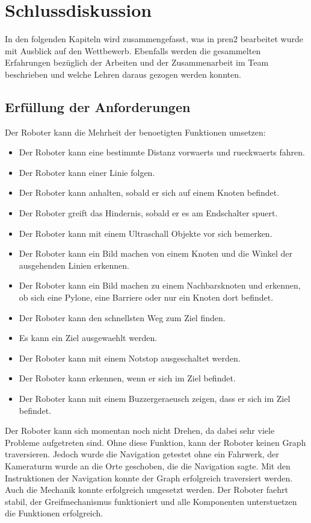 \section{Schlussdiskussion}

In den folgenden Kapiteln wird zusammengefasst, was in \acrshort{pren2} bearbeitet wurde mit Ausblick auf den Wettbewerb.
Ebenfalls werden die gesammelten Erfahrungen bezüglich der Arbeiten und der Zusammenarbeit im Team beschrieben und welche Lehren daraus gezogen werden konnten.

\subsection{Erfüllung der Anforderungen}

Der Roboter kann die Mehrheit der benoetigten Funktionen umsetzen:

\begin{itemize}
    \item Der Roboter kann eine bestimmte Distanz vorwaerts und rueckwaerts fahren.
    \item Der Roboter kann einer Linie folgen.
    \item Der Roboter kann anhalten, sobald er sich auf einem Knoten befindet.
    \item Der Roboter greift das Hindernis, sobald er es am Endschalter spuert.
    \item Der Roboter kann mit einem Ultraschall Objekte vor sich bemerken.
    \item Der Roboter kann ein Bild machen von einem Knoten und die Winkel der ausgehenden Linien erkennen.
    \item Der Roboter kann ein Bild machen zu einem Nachbarsknoten und erkennen, ob sich eine Pylone, eine Barriere oder nur ein Knoten dort befindet.
    \item Der Roboter kann den schnellsten Weg zum Ziel finden.
    \item Es kann ein Ziel ausgewaehlt werden.
    \item Der Roboter kann mit einem Notstop ausgeschaltet werden.
    \item Der Roboter kann erkennen, wenn er sich im Ziel befindet.
    \item Der Roboter kann mit einem Buzzergeraeusch zeigen, dass er sich im Ziel befindet.
\end{itemize}

Der Roboter kann sich momentan noch nicht Drehen, da dabei sehr viele Probleme aufgetreten sind. Ohne diese Funktion, kann der Roboter keinen Graph traversieren. Jedoch wurde die Navigation getestet ohne ein Fahrwerk, der Kameraturm wurde an die Orte geschoben, die die Navigation sagte. Mit den Instruktionen der Navigation konnte der Graph erfolgreich traversiert werden. Auch die Mechanik konnte erfolgreich umgesetzt werden. Der Roboter faehrt stabil, der Greifmechanismus funktioniert und alle Komponenten unterstuetzen die Funktionen erfolgreich.

